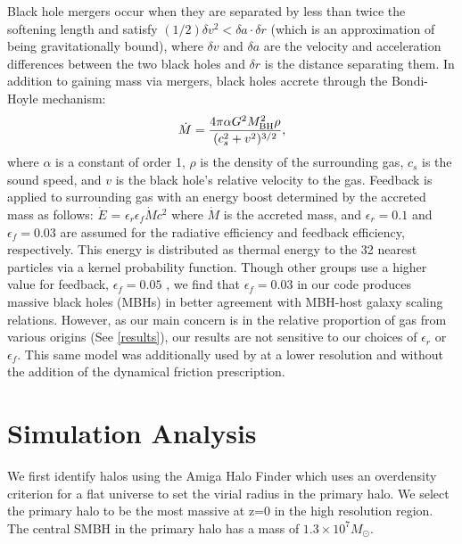 \documentclass[]{emulateapj}
\begin{document}
Black hole mergers occur when they are separated by less than twice the softening length and satisfy $(1/2) \delta v^2 < \delta a \cdot \delta r$ (which is an approximation of being gravitationally bound),  where $\delta v$ and $\delta a$ are the velocity and acceleration differences between the two black holes and $\delta r$ is the distance separating them. In addition to gaining mass via mergers, black holes accrete through the Bondi-Hoyle mechanism:
\begin{equation}
\dot{M} = \frac{4 \pi \alpha G^2 M^{2}_{\rm BH} \rho}{(c^{2}_{s} + v^2)^{3/2}},
\end{equation}
where $\alpha$ is a constant of order 1, $\rho$ is the density of the surrounding gas, $c_s$ is the sound speed, and $v$ is the black hole's relative velocity to the gas. Feedback is applied to surrounding gas with an energy boost determined by the accreted mass as follows: $\dot{E}$ = $\epsilon _{r}$$\epsilon_{f}$$\dot{M}$$c^2$ where $\dot{M}$ is the accreted mass, and $\epsilon _r = 0.1$ and $\epsilon _f = 0.03$ are assumed for the radiative efficiency and feedback efficiency, respectively. This energy is distributed as thermal energy to the 32 nearest particles via a kernel probability function. Though other groups use a higher value for feedback, $\epsilon _f = 0.05$ \citep{Sijacki2007,DiMatteo2008}, we find that $\epsilon_f = 0.03$ in our code produces massive black holes (MBHs) in better agreement with MBH-host galaxy scaling relations. However, as our main concern is in the relative proportion of gas  from various origins (See \ref{results}), our results are not sensitive to our choices of $\epsilon _{r}$ or $\epsilon_{f}$. This same model was additionally used by \cite{Bellovary2013} at a lower resolution and without the addition of the dynamical friction prescription. 







\section{Simulation Analysis}\label{redux}

We first identify halos using the Amiga Halo Finder which uses an overdensity criterion for a flat universe \citep{Knebe2001,Knollmann2009,Gill2004} to set the virial radius in the primary halo. We select the primary halo to be the most massive at z=0 in the high resolution region. The central SMBH in the primary halo has a mass of $1.3 \times 10^{7} M_{\odot}$.  
\end{document}
